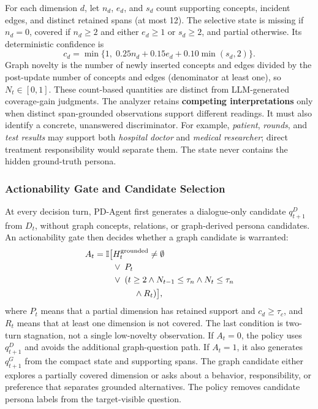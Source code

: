 \documentclass{ieeeaccess}
\begin{document}
For each dimension $d$, let $n_d$, $e_d$, and $s_d$ count supporting concepts,
incident edges, and distinct retained spans (at most 12). The selective state is
missing if $n_d=0$, covered if $n_d\ge2$ and either $e_d\ge1$ or $s_d\ge2$, and
partial otherwise. Its deterministic confidence is
\begin{equation}
c_d=\min\{1,\;0.25n_d+0.15e_d+0.10\min(s_d,2)\}.
\end{equation}
Graph novelty is the number of newly inserted concepts and edges divided by the
post-update number of concepts and edges (denominator at least one), so $N_t\in[0,1]$.
These count-based quantities are distinct from LLM-generated coverage-gain judgments.
The analyzer retains \textbf{competing interpretations} only when distinct
span-grounded observations support different readings. It must also identify a concrete,
unanswered discriminator.
For example, \textit{patient}, \textit{rounds}, and \textit{test results} may support both
\textit{hospital doctor} and \textit{medical researcher}; direct treatment responsibility
would separate them. The state never contains the hidden ground-truth persona.

\subsubsection{Actionability Gate and Candidate Selection}

At every decision turn, PD-Agent first generates a dialogue-only candidate $q_{t+1}^D$ from
$D_t$, without graph concepts, relations, or graph-derived persona candidates. An
actionability gate then decides whether a graph candidate is warranted:
\begin{equation}
\begin{aligned}
A_t=\mathbb{I}\bigl[
&H_t^{\mathrm{grounded}}\neq\emptyset \\
&{}\lor\; P_t \\
&{}\lor\; (t\ge2\land N_{t-1}\le\tau_n\land N_t\le\tau_n\\
&\hspace{2.5em}{}\land R_t)
\bigr],
\end{aligned}
\label{eq:graph_gate}
\end{equation}
where $P_t$ means that a partial dimension has retained support and $c_d\ge\tau_c$,
and $R_t$ means that at least one dimension is not covered. The last condition is
two-turn stagnation, not a single low-novelty observation. If $A_t=0$,
the policy uses $q_{t+1}^D$ and avoids the additional graph-question path. If $A_t=1$, it also
generates $q_{t+1}^G$ from the compact state and supporting spans. The graph candidate either explores a partially covered dimension or asks about a
behavior, responsibility, or preference that separates grounded alternatives. The policy
removes candidate persona labels from the target-visible question.
\end{document}
